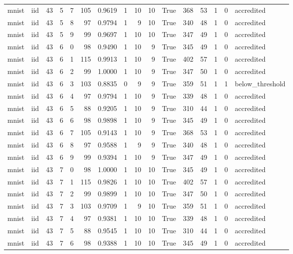 \begin{tabular}{llrrrrrrrrrrrrrl}
mnist & iid & 43 & 5 & 7 & 105 & 0.9619 & 1 & 10 & 10 & True & 368 & 53 & 1 & 0 & accredited \\
mnist & iid & 43 & 5 & 8 & 97 & 0.9794 & 1 & 9 & 10 & True & 340 & 48 & 1 & 0 & accredited \\
mnist & iid & 43 & 5 & 9 & 99 & 0.9697 & 1 & 10 & 10 & True & 347 & 49 & 1 & 0 & accredited \\
mnist & iid & 43 & 6 & 0 & 98 & 0.9490 & 1 & 10 & 9 & True & 345 & 49 & 1 & 0 & accredited \\
mnist & iid & 43 & 6 & 1 & 115 & 0.9913 & 1 & 10 & 9 & True & 402 & 57 & 1 & 0 & accredited \\
mnist & iid & 43 & 6 & 2 & 99 & 1.0000 & 1 & 10 & 9 & True & 347 & 50 & 1 & 0 & accredited \\
mnist & iid & 43 & 6 & 3 & 103 & 0.8835 & 0 & 9 & 9 & True & 359 & 51 & 1 & 1 & below\_threshold \\
mnist & iid & 43 & 6 & 4 & 97 & 0.9794 & 1 & 10 & 9 & True & 339 & 48 & 1 & 0 & accredited \\
mnist & iid & 43 & 6 & 5 & 88 & 0.9205 & 1 & 10 & 9 & True & 310 & 44 & 1 & 0 & accredited \\
mnist & iid & 43 & 6 & 6 & 98 & 0.9898 & 1 & 10 & 9 & True & 345 & 49 & 1 & 0 & accredited \\
mnist & iid & 43 & 6 & 7 & 105 & 0.9143 & 1 & 10 & 9 & True & 368 & 53 & 1 & 0 & accredited \\
mnist & iid & 43 & 6 & 8 & 97 & 0.9588 & 1 & 9 & 9 & True & 340 & 48 & 1 & 0 & accredited \\
mnist & iid & 43 & 6 & 9 & 99 & 0.9394 & 1 & 10 & 9 & True & 347 & 49 & 1 & 0 & accredited \\
mnist & iid & 43 & 7 & 0 & 98 & 1.0000 & 1 & 10 & 10 & True & 345 & 49 & 1 & 0 & accredited \\
mnist & iid & 43 & 7 & 1 & 115 & 0.9826 & 1 & 10 & 10 & True & 402 & 57 & 1 & 0 & accredited \\
mnist & iid & 43 & 7 & 2 & 99 & 0.9899 & 1 & 10 & 10 & True & 347 & 50 & 1 & 0 & accredited \\
mnist & iid & 43 & 7 & 3 & 103 & 0.9709 & 1 & 9 & 10 & True & 359 & 51 & 1 & 0 & accredited \\
mnist & iid & 43 & 7 & 4 & 97 & 0.9381 & 1 & 10 & 10 & True & 339 & 48 & 1 & 0 & accredited \\
mnist & iid & 43 & 7 & 5 & 88 & 0.9545 & 1 & 10 & 10 & True & 310 & 44 & 1 & 0 & accredited \\
mnist & iid & 43 & 7 & 6 & 98 & 0.9388 & 1 & 10 & 10 & True & 345 & 49 & 1 & 0 & accredited \\

\end{tabular}
